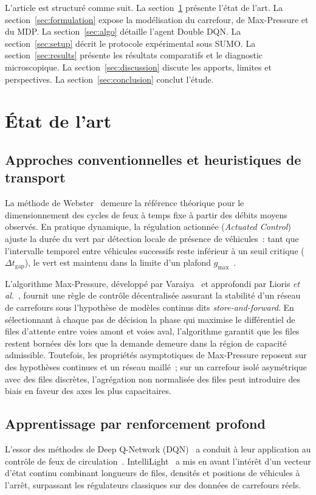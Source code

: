 \documentclass[11pt,a4paper]{article}
\begin{document}
L'article est structuré comme suit. La section~\ref{sec:related} présente l'état de l'art. La section~\ref{sec:formulation} expose la modélisation du carrefour, de Max-Pressure et du MDP. La section~\ref{sec:algo} détaille l'agent Double DQN. La section~\ref{sec:setup} décrit le protocole expérimental sous SUMO. La section~\ref{sec:results} présente les résultats comparatifs et le diagnostic microscopique. La section~\ref{sec:discussion} discute les apports, limites et perspectives. La section~\ref{sec:conclusion} conclut l'étude.

\section{État de l'art}
\label{sec:related}

\subsection{Approches conventionnelles et heuristiques de transport}
La méthode de Webster~\cite{webster1958traffic} demeure la référence théorique pour le dimensionnement des cycles de feux à temps fixe à partir des débits moyens observés. En pratique dynamique, la régulation actionnée (\emph{Actuated Control}) ajuste la durée du vert par détection locale de présence de véhicules~: tant que l'intervalle temporel entre véhicules successifs reste inférieur à un seuil critique ($\Delta t_{\text{gap}}$), le vert est maintenu dans la limite d'un plafond $g_{\max}$~\cite{day2016detector}.

L'algorithme Max-Pressure, développé par Varaiya~\cite{varaiya2013max} et approfondi par Lioris \emph{et al.}~\cite{lioris2016max}, fournit une règle de contrôle décentralisée assurant la stabilité d'un réseau de carrefours sous l'hypothèse de modèles continus dits \emph{store-and-forward}. En sélectionnant à chaque pas de décision la phase qui maximise le différentiel de files d'attente entre voies amont et voies aval, l'algorithme garantit que les files restent bornées dès lors que la demande demeure dans la région de capacité admissible. Toutefois, les propriétés asymptotiques de Max-Pressure reposent sur des hypothèses continues et un réseau maillé~; sur un carrefour isolé asymétrique avec des files discrètes, l'agrégation non normalisée des files peut introduire des biais en faveur des axes les plus capacitaires.

\subsection{Apprentissage par renforcement profond}
L'essor des méthodes de Deep Q-Network (DQN)~\cite{mnih2015human} a conduit à leur application au contrôle de feux de circulation~\cite{genders2016using}. IntelliLight~\cite{wei2018intellilight} a mis en avant l'intérêt d'un vecteur d'état continu combinant longueurs de files, densités et positions de véhicules à l'arrêt, surpassant les régulateurs classiques sur des données de carrefours réels.
\end{document}
